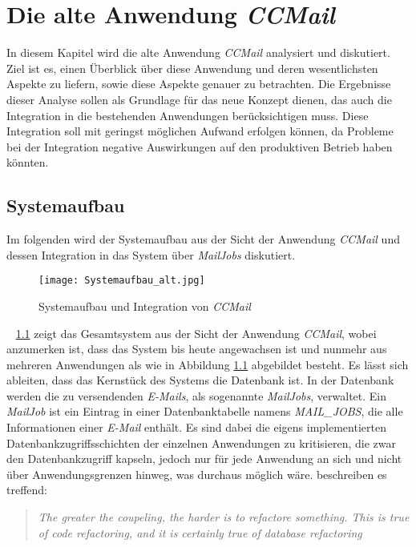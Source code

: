 \chapter{Die alte Anwendung \emph{CCMail}}
\label{cha:ccmail}
In diesem Kapitel wird die alte Anwendung \emph{CCMail} analysiert und diskutiert. Ziel ist es, einen Überblick über diese Anwendung und deren wesentlichsten Aspekte zu liefern, sowie diese Aspekte genauer zu betrachten. Die Ergebnisse dieser Analyse sollen als Grundlage für das neue Konzept dienen, das auch die Integration in die bestehenden Anwendungen berücksichtigen muss. Diese Integration soll mit geringst möglichen Aufwand erfolgen können, da Probleme bei der Integration negative Auswirkungen auf den produktiven Betrieb haben könnten. 

\section{Systemaufbau}
\label{sec:ccmail-systemaufbau}
Im folgenden wird der Systemaufbau aus der Sicht der Anwendung \emph{CCMail} und dessen Integration in das System über \emph{MailJobs} diskutiert. 
\begin{figure}[h]
\centering
\texttt{[image: Systemaufbau\_alt.jpg]} %
\caption{Systemaufbau und Integration von \emph{CCMail}}
\label{fig:ccmail-system-und-integration}
\end{figure}
\ \newpage
{} \ref{fig:ccmail-system-und-integration} zeigt das Gesamtsystem aus der Sicht der Anwendung \emph{CCMail}, wobei anzumerken ist, dass das System bis heute angewachsen ist und nunmehr aus mehreren Anwendungen als wie in Abbildung  \ref{fig:ccmail-system-und-integration} abgebildet besteht. Es lässt sich ableiten, dass das Kernstück des Systems die Datenbank ist. In der Datenbank werden die zu versendenden \emph{E-Mails}, als sogenannte \emph{MailJobs}, verwaltet. Ein \emph{MailJob} ist ein Eintrag in einer Datenbanktabelle namens \emph{MAIL\_JOBS}, die alle Informationen einer \emph{E-Mail} enthält. Es sind dabei die eigens implementierten Datenbankzugriffsschichten der einzelnen Anwendungen zu kritisieren, die zwar den Datenbankzugriff kapseln, jedoch nur für jede Anwendung an sich und nicht über Anwendungsgrenzen hinweg, was durchaus möglich wäre. \cite[27]{refactoreDatabase} beschreiben es treffend:
\begin{quote}
\emph{The greater the coupeling, the harder is to refactore something. This is true of code refactoring, and it is certainly true of database refactoring}
\end{quote}
